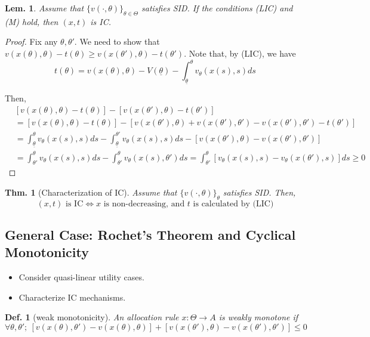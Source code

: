 \documentclass[11pt,a4paper,dvipdfmx]{article}
\theoremstyle{plain}
\newtheorem{thm}{Thm.}[section]
\newtheorem{lem}{Lem.}[section]
\newtheorem{df}{Def.}[section]
\newcommand{\equi}{\Longleftrightarrow}
\newcommand{\1}{\mathbbm{1}}
\begin{document}
\begin{lem}
	Assume that $\{v(\cdot, \theta)\}_{\theta \in \Theta}$ satisfies SID. If the conditions (LIC) and (M) hold, then $(x,t)$ is IC.
\end{lem}
\begin{proof}
	Fix any $\theta, \theta'$. We need to show that $v(x(\theta), \theta) - t(\theta) \geq v(x(\theta'), \theta) - t(\theta')$.
	Note that, by (LIC), we have 
	\[
	t(\theta) = v(x(\theta), \theta) - V(\underline{\theta}) - \int_{\underline{\theta}}^\theta
	 v_\theta(x(s), s) ds
	\]
	
	Then,
	\begin{align*}
		&[v(x(\theta), \theta) - t(\theta)] - [v(x(\theta'), \theta) - t(\theta')] \\
		&=
		[v(x(\theta), \theta) - t(\theta)] - [v(x(\theta'), \theta) + v(x(\theta'), \theta') - v(x(\theta'), \theta') - t(\theta')] \\
		&=
		\int_{\underline{\theta}}^\theta v_\theta(x(s), s) ds
		- \int_{\underline{\theta}}^{\theta'} v_\theta(x(s), s) ds
		- [v(x(\theta'), \theta) - v(x(\theta'), \theta')] \\
		&= \int_{\theta'}^\theta v_\theta(x(s), s) ds
		- \int_{\theta'}^\theta v_\theta(x(s), \theta') ds
		= \int_{\theta'}^\theta [v_\theta(x(s), s) - v_\theta(x(\theta'), s)] ds \geq 0
	\end{align*}
\end{proof}

\begin{thm}[Characterization of IC] \label{ic_char}
	Assume that $\{v(\cdot, \theta)\}_\theta$ satisfies SID. Then, 
	\[
	\text{$(x, t)$ is IC} \equi \text{$x$ is non-decreasing, and $t$ is calculated by (LIC)}
	\]
\end{thm}


\subsection{General Case: Rochet's Theorem and Cyclical Monotonicity}
\begin{itemize}
	\item Consider quasi-linear utility cases.
	\item Characterize IC mechanisms.
\end{itemize}

\begin{df}[weak monotonicity]
	An allocation rule $x: \Theta \to A$ is weakly monotone if
	\[
	\forall \theta, \theta' ; \ [v(x(\theta), \theta') - v(x(\theta), \theta)]  + [v(x(\theta'), \theta) - v(x(\theta'), \theta')] \leq 0
	\]
\end{df}
\end{document}

